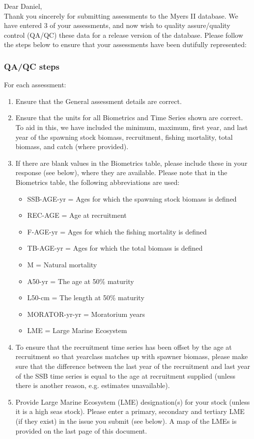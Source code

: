 \documentclass [a4paper, 10pt] {article}
\begin{document}
\noindent Dear Daniel,\\

\noindent Thank you sincerely for submitting assessments to the Myers II database. We have entered 3 of your assessments, and now wish to quality assure/quality control (QA/QC) these data for a release version of the database. Please follow the steps below to ensure that your assessments have been dutifully represented:
\subsubsection{QA/QC steps}
For each assessment:
\begin{enumerate}
\item Ensure that the General assessment details are correct.
\item Ensure that the units for all Biometrics and Time Series shown are correct. To aid in this, we have included the minimum, maximum, first year, and last year of the spawning stock biomass, recruitment, fishing mortality, total biomass, and  catch  (where provided). 
\item If there are blank values in the Biometrics table, please include these in your response (see below), where they are available.
Please note that in the Biometrics table, the following abbreviations are used:
\begin{itemize}
\item SSB-AGE-yr  = Ages for which the spawning stock biomass is defined
\item REC-AGE     = Age at recruitment
\item F-AGE-yr    = Ages for which the fishing mortality is defined 
\item TB-AGE-yr   = Ages for which the total biomass is defined
\item M      = Natural mortality
\item A50-yr      = The age at 50\% maturity
\item L50-cm      = The length at 50\% maturity
\item MORATOR-yr-yr = Moratorium years
\item LME = Large Marine Ecosystem\\
\end{itemize}
\item To ensure that the recruitment time series has been offset by the age at recruitment so that yearclass matches up with spawner biomass, please make sure that the difference between the last year of the recruitment and last year of the SSB time series is equal to the age at recruitment supplied (unless there is another reason, e.g. estimates unavailable). 
\item Provide Large Marine Ecosystem (LME) designation(s) for your stock (unless it is a high seas stock). Please enter a primary, secondary and tertiary LME (if they exist) in the issue you submit (see below). A map of the LMEs is provided on the last page of this document. 
\end{enumerate}
\vspace{-.25in}
\end{document}
